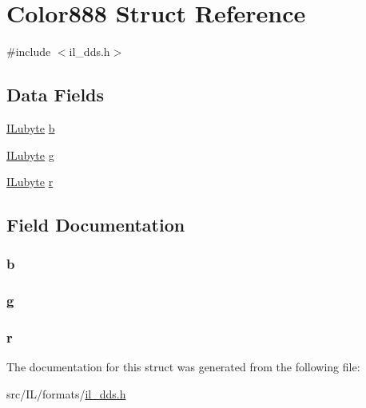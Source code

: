 \hypertarget{struct_color888}{\section{Color888 Struct Reference}
\label{struct_color888}
}


{\ttfamily \#include $<$il\-\_\-dds.\-h$>$}

\subsection*{Data Fields}
\begin{DoxyCompactItemize}
\item 
\hyperlink{il_8h_a8d2f04500100a86d1b00e98ab1b15a33}{I\-Lubyte} \hyperlink{struct_color888_a767438b01504b1c7932519cfe8b34a1b}{b}
\item 
\hyperlink{il_8h_a8d2f04500100a86d1b00e98ab1b15a33}{I\-Lubyte} \hyperlink{struct_color888_a813a7b494594f710f6e04f086cb60fe7}{g}
\item 
\hyperlink{il_8h_a8d2f04500100a86d1b00e98ab1b15a33}{I\-Lubyte} \hyperlink{struct_color888_afedb8d54ff10b9cac4be2824f3928524}{r}
\end{DoxyCompactItemize}


\subsection{Field Documentation}
\hypertarget{struct_color888_a767438b01504b1c7932519cfe8b34a1b}{
\subsubsection[{b}]{ b}}\label{struct_color888_a767438b01504b1c7932519cfe8b34a1b}
\hypertarget{struct_color888_a813a7b494594f710f6e04f086cb60fe7}{
\subsubsection[{g}]{ g}}\label{struct_color888_a813a7b494594f710f6e04f086cb60fe7}
\hypertarget{struct_color888_afedb8d54ff10b9cac4be2824f3928524}{
\subsubsection[{r}]{ r}}\label{struct_color888_afedb8d54ff10b9cac4be2824f3928524}


The documentation for this struct was generated from the following file\-:\begin{DoxyCompactItemize}
\item 
src/\-I\-L/formats/\hyperlink{il__dds_8h}{il\-\_\-dds.\-h}\end{DoxyCompactItemize}
